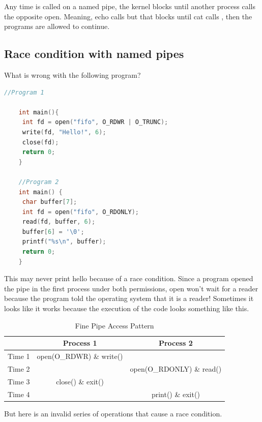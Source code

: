 Any time  is called on a named pipe, the kernel blocks until another process calls the opposite open. Meaning, echo calls  but that blocks until cat calls , then the programs are allowed to continue.
	 
\subsection{Race condition with named pipes}
	 
What is wrong with the following program?
	 
\begin{lstlisting}[language=C]
	//Program 1
	 
	int main(){
	 int fd = open("fifo", O_RDWR | O_TRUNC);
	 write(fd, "Hello!", 6);
	 close(fd);
	 return 0;
	}
	 
	//Program 2
	int main() {
	 char buffer[7];
	 int fd = open("fifo", O_RDONLY);
	 read(fd, buffer, 6);
	 buffer[6] = '\0';
	 printf("%s\n", buffer);
	 return 0;
	}
\end{lstlisting}
	 
This may never print hello because of a race condition.
Since a program opened the pipe in the first process under both permissions, open won't wait for a reader because the program told the operating system that it is a reader!
Sometimes it looks like it works because the execution of the code looks something like this.
	 
\begin{center}
	\begin{table}[h]
		\caption{Fine Pipe Access Pattern}
		\begin{tabular}{|c|c|c|}
			       & Process 1                & Process 2                 \\ \hline
			Time 1 & open(O\_RDWR) \& write() &                           \\
			Time 2 &                          & open(O\_RDONLY) \& read() \\
			Time 3 & close() \& exit()        &                           \\
			Time 4 &                          & print() \& exit()         \\
		\end{tabular}
	\end{table}
\end{center}
	 
But here is an invalid series of operations that cause a race condition.
	 
